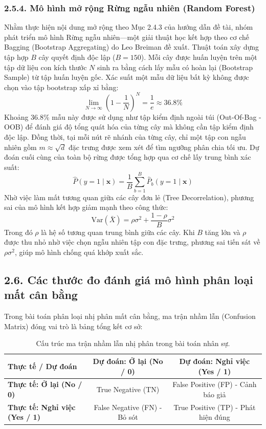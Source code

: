 \documentclass[12pt,a4paper]{article}
\begin{document}
\subsubsection{2.5.4. Mô hình mở rộng Rừng ngẫu nhiên (Random Forest)}
Nhằm thực hiện nội dung mở rộng theo Mục 2.4.3 của hướng dẫn đề tài, nhóm phát triển mô hình Rừng ngẫu nhiên—một giải thuật học kết hợp theo cơ chế Bagging (Bootstrap Aggregating) do Leo Breiman đề xuất. Thuật toán xây dựng tập hợp $B$ cây quyết định độc lập ($B=150$). Mỗi cây được huấn luyện trên một tập dữ liệu con kích thước $N$ sinh ra bằng cách lấy mẫu có hoàn lại (Bootstrap Sample) từ tập huấn luyện gốc. Xác suất một mẫu dữ liệu bất kỳ không được chọn vào tập bootstrap xấp xỉ bằng:
\begin{equation}
\lim_{N \to \infty} \left(1 - \frac{1}{N}\right)^N = \frac{1}{e} \approx 36.8\%
\end{equation}
Khoảng 36.8\% mẫu này được sử dụng như tập kiểm định ngoài túi (Out-Of-Bag - OOB) để đánh giá độ tổng quát hóa của từng cây mà không cần tập kiểm định độc lập. Đồng thời, tại mỗi nút rẽ nhánh của từng cây, chỉ một tập con ngẫu nhiên gồm $m \approx \sqrt{d}$ đặc trưng được xem xét để tìm ngưỡng phân chia tối ưu. Dự đoán cuối cùng của toàn bộ rừng được tổng hợp qua cơ chế lấy trung bình xác suất:
\begin{equation}
\hat{P}(y=1 \mid \mathbf{x}) = \frac{1}{B} \sum_{b=1}^B \hat{P}_b(y=1 \mid \mathbf{x})
\end{equation}
Nhờ việc làm mất tương quan giữa các cây đơn lẻ (Tree Decorrelation), phương sai của mô hình kết hợp giảm mạnh theo công thức:
\begin{equation}
\text{Var}(\bar{X}) = \rho \sigma^2 + \frac{1-\rho}{B} \sigma^2
\end{equation}
Trong đó $\rho$ là hệ số tương quan trung bình giữa các cây. Khi $B$ tăng lớn và $\rho$ được thu nhỏ nhờ việc chọn ngẫu nhiên tập con đặc trưng, phương sai tiến sát về $\rho \sigma^2$, giúp mô hình chống quá khớp xuất sắc.

\subsection{2.6. Các thước đo đánh giá mô hình phân loại mất cân bằng}
Trong bài toán phân loại nhị phân mất cân bằng, ma trận nhầm lẫn (Confusion Matrix) đóng vai trò là bảng tổng kết cơ sở:
\begin{table}[H]
\centering
\caption{Cấu trúc ma trận nhầm lẫn nhị phân trong bài toán nhân sự.}
\label{tab:confusion_matrix_concept}
\small
\begin{tabular}{|l|c|c|}
\hline
\textbf{Thực tế / Dự đoán} & \textbf{Dự đoán: Ở lại (No / 0)} & \textbf{Dự đoán: Nghỉ việc (Yes / 1)} \\
\hline
\textbf{Thực tế: Ở lại (No / 0)} & True Negative (TN) & False Positive (FP) - Cảnh báo giả \\
\hline
\textbf{Thực tế: Nghỉ việc (Yes / 1)} & False Negative (FN) - Bỏ sót & True Positive (TP) - Phát hiện đúng \\
\hline
\end{tabular}
\end{table}
\end{document}
